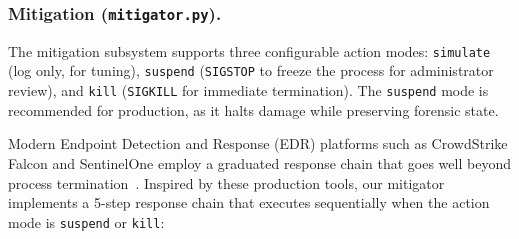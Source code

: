 \documentclass[twocolumn, 10pt]{scrartcl}
\begin{document}
\subsubsection{Mitigation (\texttt{mitigator.py}).}
The mitigation subsystem supports three configurable action modes: \texttt{simulate} (log only, for tuning), \texttt{suspend} (\texttt{SIGSTOP} to freeze the process for administrator review), and \texttt{kill} (\texttt{SIGKILL} for immediate termination). The \texttt{suspend} mode is recommended for production, as it halts damage while preserving forensic state.

Modern Endpoint Detection and Response (EDR) platforms such as CrowdStrike Falcon and SentinelOne employ a graduated response chain that goes well beyond process termination~\cite{cybervigilance_s1}. Inspired by these production tools, our mitigator implements a 5-step response chain that executes sequentially when the action mode is \texttt{suspend} or \texttt{kill}:
\end{document}
